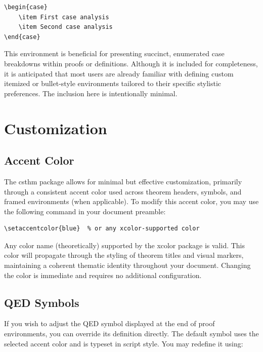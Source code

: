 \documentclass[10pt,letterpaper]{amsart}
\begin{document}
\begin{verbatim}
\begin{case}
    \item First case analysis
    \item Second case analysis
\end{case}
\end{verbatim}

This environment is beneficial for presenting succinct, enumerated case
breakdowns within proofs or definitions. Although it is included for
completeness, it is anticipated that most users are already familiar with
defining custom itemized or bullet-style environments tailored to their
specific stylistic preferences. The inclusion here is intentionally minimal.

\section{Customization}

\subsection{Accent Color}

The \textsf{csthm} package allows for minimal but effective customization,
primarily through a consistent accent color used across theorem headers,
symbols, and framed environments (when applicable). To modify this accent
color, you may use the following command in your document preamble:

\begin{verbatim}
\setaccentcolor{blue}  % or any xcolor-supported color
\end{verbatim}

Any color name (theoretically) supported by the \textsf{xcolor} package is
valid. This color will propagate through the styling of theorem titles and
visual markers, maintaining a coherent thematic identity throughout your
document. Changing the color is immediate and requires no additional
configuration.

\subsection{QED Symbols}

If you wish to adjust the QED symbol displayed at the end of proof
environments, you can override its definition directly. The default symbol uses
the selected accent color and is typeset in script style. You may redefine it
using:
\end{document}
